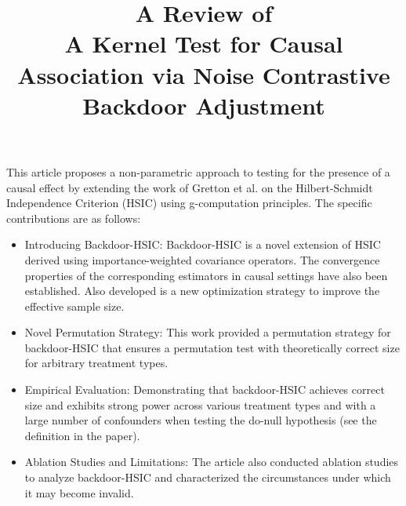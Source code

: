 \documentclass[11pt]{article}
\title{A Review of \\ A Kernel Test for Causal Association via
	Noise Contrastive Backdoor Adjustment}
\begin{document}
	\maketitle	
	

This article proposes a non-parametric approach to testing for the presence of a causal effect by extending the work of Gretton et al. on the Hilbert-Schmidt Independence Criterion (HSIC) using g-computation principles. The specific contributions are as follows:
\begin{itemize}
	\item Introducing Backdoor-HSIC: Backdoor-HSIC is a novel extension of HSIC derived using importance-weighted covariance operators. The convergence properties of the corresponding estimators in causal settings have also been established. Also developed is a new optimization strategy to improve the effective sample size.
	\item Novel Permutation Strategy: This work provided a permutation strategy for backdoor-HSIC that ensures a permutation test with theoretically correct size for arbitrary treatment types.
	\item Empirical Evaluation: Demonstrating that backdoor-HSIC achieves correct size and exhibits strong power across various treatment types and with a large number of confounders when testing the do-null hypothesis (see the definition in the paper).
	\item Ablation Studies and Limitations: The article also conducted ablation studies to analyze backdoor-HSIC and characterized the circumstances under which it may become invalid.
\end{itemize}
	
\end{document}
